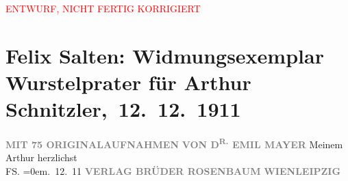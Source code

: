 
\begin{center}
            \textcolor{red}{ENTWURF, NICHT FERTIG KORRIGIERT}
                      \end{center}
            
         
         \renewcommand{\erwaehntePersonen}{Personen: Emil Mayer, Felix Salten}
         \renewcommand{\erwaehnteInstitutionen}{Institutionen: Verlagsanstalt Brüder Rosenbaum}
         \renewcommand{\erwaehnteOrte}{Orte: Leipzig, Wien}
         \renewcommand{\erwaehnteWerke}{Werke: Wurstelprater}
               \section[ Felix Salten: Widmungsexemplar Wurstelprater für Arthur Schnitzler, 12. 12. 1911]{ Felix Salten: Widmungsexemplar Wurstelprater für Arthur
               Schnitzler, 12. 12. 1911}\nopagebreak{}\rehead{ }\begin{ledgroupsized}[t]{13cm}\normalsize\beginnumbering \toendnotes[C]{\smallbreak\pagebreak[2]} 
\toendnotes[C]{\smallbreak}\pstart
           \noindent{}\centering{}{\pb}\textcolor{gray}{\textbf{\textbf{}}}\pend
           \pstart
           \noindent{}\centering{}\textcolor{gray}{\textbf{}}\pend
           \pstart
           \noindent{}\centering{}\textcolor{gray}{\textbf{MIT 75 ORIGINALAUFNAHMEN}}\pend
           \pstart
           \noindent{}\centering{}\textcolor{gray}{\textbf{VON D\textsuperscript{R.}{ }EMIL MAYER}}\pend
           \pstart
           \noindent{}Meinem \label{K_L03052-1v}\label{K_L03052-1h} Arthur\pend
           \pstart
           herzlichst{\\[\baselineskip]}\spacefill\mbox{FS.}\pend
           \leftskip=0em{}. 12. 11\pend
           {\bigskip}\pstart
           \noindent{}\centering{}\textcolor{gray}{\textbf{VERLAG BRÜDER ROSENBAUM}}\pend
           \pstart
           \noindent{}\textcolor{gray}{\textbf{WIEN}}\hfill \textcolor{gray}{\textbf{LEIPZIG}}\pend
           
         
         \endnumbering{}\end{ledgroupsized}  \newcommand{\dateiname}{L03052}\newcommand{\titel}{Felix Salten: Widmungsexemplar Wurstelprater für Arthur Schnitzler, 12. 12. 1911}\newcommand{\editorInnen}{Martin Anton Müller und Laura Untner}
      